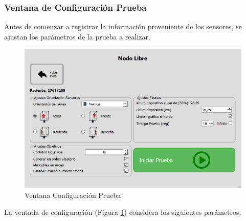 \documentclass[12pt,a4paper]{article}
\begin{document}
\subsubsection{Ventana de Configuración Prueba}
Antes de comenzar a registrar la información proveniente de los sensores, se ajustan los parámetros de la prueba a realizar.

\begin{figure}[H]
	\centering
	\includegraphics[scale=0.6]{images/configurarPrueba}
	\caption{Ventana Configuración Prueba}
	\label{fig:configurarPrueba}
\end{figure}

La ventada de configuración (Figura \ref{fig:configurarPrueba}) considera los siguientes parámetros.
\end{document}

